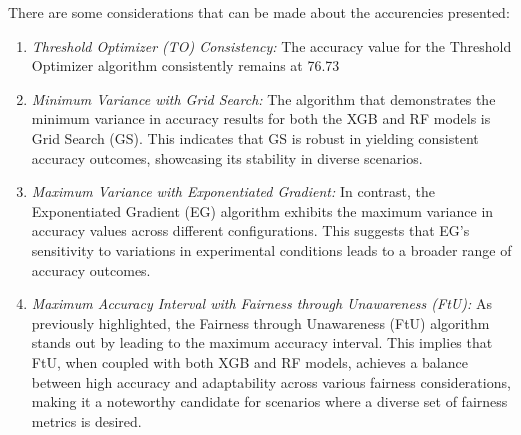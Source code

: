 There are some considerations that can be made about the accurencies presented:
\begin{enumerate}
    \item \emph{Threshold Optimizer (TO) Consistency:} The accuracy value for the Threshold Optimizer algorithm consistently remains at 76.73%

    \item \emph{Minimum Variance with Grid Search:} The algorithm that demonstrates the minimum variance in accuracy results for both the XGB and RF models is Grid Search (GS). This indicates that GS is robust in yielding consistent accuracy outcomes, showcasing its stability in diverse scenarios.

    \item \emph{Maximum Variance with Exponentiated Gradient:} In contrast, the Exponentiated Gradient (EG) algorithm exhibits the maximum variance in accuracy values across different configurations. This suggests that EG's sensitivity to variations in experimental conditions leads to a broader range of accuracy outcomes.

    \item \emph{Maximum Accuracy Interval with Fairness through Unawareness (FtU):} As previously highlighted, the Fairness through Unawareness (FtU) algorithm stands out by leading to the maximum accuracy interval. This implies that FtU, when coupled with both XGB and RF models, achieves a balance between high accuracy and adaptability across various fairness considerations, making it a noteworthy candidate for scenarios where a diverse set of fairness metrics is desired.
\end{enumerate}

